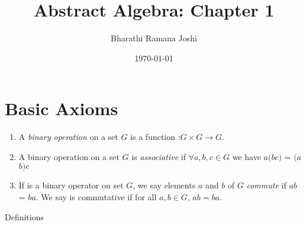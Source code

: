 \documentclass[titlepage, 12pt]{article}
\begin{document}
\title{Abstract Algebra: Chapter 1}

\author{Bharathi Ramana Joshi}

\date{\today}

\maketitle

\tableofcontents

\newpage


\section{Basic Axioms}

\begin{enumerate}

	\item A \textit{binary operation}  on a set $G$ is a function
		:$G\times G\rightarrow G$.

	\item A binary operation  on a set $G$ is \textit{associative} if
		$\forall a, b, c\in G$ we have $a$$(b$$c)$ =
		$(a$$ b)$$ c$

	\item If  is a binary operator on set $G$, we say elements $a$
		and $b$ of $G$ \textit{commute} if $a$$b$  = $b$$a$.
		We say  is commutative if for all $a, b\in G$, $a$$b =
		b$$a$.

\end{enumerate}

Definitions
\end{document}
